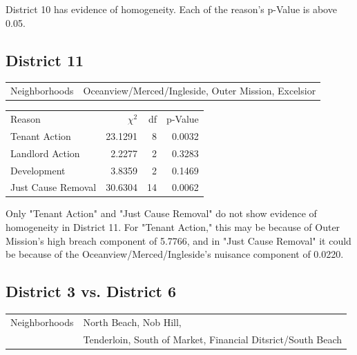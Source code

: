 \documentclass[]{article}
\begin{document}
District 10 has evidence of homogeneity. Each of the reason's p-Value is above 0.05.

\subsection{District 11}

\begin{table}[!h]
	\centering
	\begin{tabular}{l | l}
		Neighborhoods &  Oceanview/Merced/Ingleside, Outer Mission, Excelsior  \\
	\end{tabular}
\end{table}
\FloatBarrier

\begin {table}[!h]
\centering
\begin{tabular}{l | r | r | r}
	
	Reason				 &  $\chi ^{2}$ & df & p-Value \\
	Tenant Action 		   &  23.1291  &  8  & 0.0032 \\
	Landlord Action	       &   2.2277 &  2  & 0.3283 \\
	Development			   &  3.8359  &  2  & 0.1469 \\
	Just Cause Removal	   &  30.6304  &  14  & 0.0062 \\
\end{tabular} \newline
\end{table}
\FloatBarrier

Only "Tenant Action" and "Just Cause Removal" do not show evidence of homogeneity in District 11. For "Tenant Action," this may be because of Outer Mission's high breach component of 5.7766, and in "Just Cause Removal" it could be because of the Oceanview/Merced/Ingleside's nuisance component of 0.0220.

\newpage
\subsection{District 3 vs. District 6}
\begin{table}[h]
\centering
\begin{tabular}{l | l}
Neighborhoods &  North Beach, Nob Hill, 			 \\ 
			  &  Tenderloin, South of Market, Financial Ditsrict/South Beach \\
\end{tabular}
\end{table}
\end{document}
